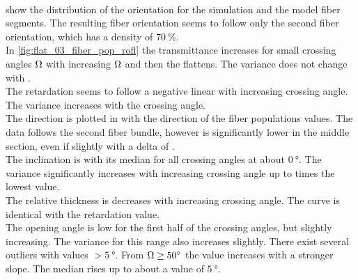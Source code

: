 \\
% 
 show the distribution of the orientation for the simulation and the model fiber segments.
The resulting fiber orientation seems to follow only the second fiber orientation, which has a density of $\SI{70}{\percent}$.
\\
In \cref{fig:flat_03_fiber_pop_rofl} the transmittance increases for small crossing angles $\textnormal{$\Omega$}$ with increasing $\textnormal{$\Omega$}$ and then the \dummy{} flattens.
The variance does not change with \dummy[value]{}.
\\
The retardation seems to follow a negative linear \dummy{} with increasing crossing angle.
The variance increases with the crossing angle.
\\
The direction is plotted in \dummy{} with the direction of the fiber populations values.
The data follows the second fiber bundle, however is significantly lower in the middle section, even if slightly with a delta of \dummy[value]{}.
\\
The inclination is with its median for all crossing angles at about $\SI{0}{\degree}$.
The variance significantly increases with increasing crossing angle up to \dummy[3]{} times the lowest value.
\\
The relative thickness is decreases with increasing crossing angle.
The curve is identical with the retardation value.
\\
The opening angle is low for the first half of the crossing angles, but slightly increasing.
The variance for this range also increases slightly.
There exist several outliers with values $> \SI{5}{\degree}$.
From $\textnormal{$\Omega$} \ge \SI{50}{\degree}$ the value increases with a stronger slope.
The median rises up to about a value of $\SI{5}{\degree}$.
% 
% 
